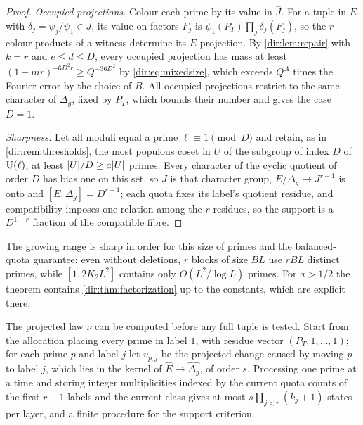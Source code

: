 \begin{proof}
\emph{Occupied projections.} Colour each prime by its value in $\widehat J$. For a tuple in $E$ with
$\delta_j=\widetilde\psi_j/\widetilde\psi_1\in J$, its value on factors $F_j$ is
$\widetilde\psi_1(P_T)\prod_j\delta_j(F_j)$, so the $r$ colour products of a witness determine its
$E$-projection. By \cref{dir:lem:repair} with $k=r$ and $e\le d\le D$, every occupied projection has
mass at least $(1+mr)^{-6D^2r}\ge Q^{-36D^2}$ by \eqref{dir:eq:mixedsize}, which exceeds $Q^A$ times the
Fourier error by the choice of $B$. All occupied projections restrict to the same character of
$\Delta_g$, fixed by $P_T$, which bounds their number and gives the case $D=1$.

\emph{Sharpness.} Let all moduli equal a prime $\ell\equiv1\pmod D$ and retain, as in
\cref{dir:rem:thresholds}, the most populous coset in $U$ of the subgroup of index $D$ of $\mathrm{U}(\ell)$, at
least $\lvert U\rvert/D\ge a\lvert U\rvert$ primes. Every
character of the cyclic quotient of order $D$ has bias one on this set, so $J$ is that character
group, $E/\Delta_g\to J^{r-1}$ is onto and $[E:\Delta_g]=D^{r-1}$; each quota fixes its label's quotient
residue, and compatibility imposes one relation among the $r$ residues, so the support is a $D^{1-r}$
fraction of the compatible fibre.
\end{proof}

The growing range is sharp in order for this size of primes and the balanced-quota guarantee: even
without deletions, $r$ blocks of size $BL$ use $rBL$ distinct primes, while $[1,2K_2L^2]$ contains only
$O(L^2/\log L)$ primes. For $a>1/2$ the theorem contains \cref{dir:thm:factorization} up to the
constants, which are explicit there.

The projected law $\nu$ can be computed before any full tuple is tested. Start from the
allocation placing every prime in label $1$, with residue vector $(P_T,1,\dots,1)$; for each
prime $p$ and label $j$ let $v_{p,j}$ be the projected change caused by moving $p$ to label $j$,
which lies in the kernel of $\widehat E\to\widehat{\Delta_g}$, of order $s$. Processing one prime
at a time and storing integer multiplicities indexed by the current quota counts of the first
$r-1$ labels and the current class gives at most $s\prod_{j<r}(k_j+1)$ states per layer, and a
finite procedure for the support criterion.

